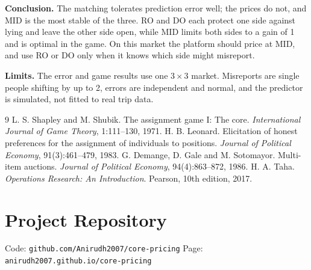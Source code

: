 \documentclass[11pt,a4paper]{article}
\begin{document}
\textbf{Conclusion.} The matching tolerates prediction error well; the prices do not, and MID is the most stable of the three. RO and DO each protect one side against lying and leave the other side open, while MID limits both sides to a gain of 1 and is optimal in the game. On this market the platform should price at MID, and use RO or DO only when it knows which side might misreport.

\textbf{Limits.} The error and game results use one $3\times3$ market. Misreports are single people shifting by up to 2, errors are independent and normal, and the predictor is simulated, not fitted to real trip data.

{\footnotesize
\begin{thebibliography}{9}
\setlength{\itemsep}{0pt}
 L. S. Shapley and M. Shubik. The assignment game I: The core. \emph{International Journal of Game Theory}, 1:111--130, 1971.
 H. B. Leonard. Elicitation of honest preferences for the assignment of individuals to positions. \emph{Journal of Political Economy}, 91(3):461--479, 1983.
 G. Demange, D. Gale and M. Sotomayor. Multi-item auctions. \emph{Journal of Political Economy}, 94(4):863--872, 1986.
 H. A. Taha. \emph{Operations Research: An Introduction}. Pearson, 10th edition, 2017.
\end{thebibliography}
}

\section*{Project Repository}
{\small Code: \texttt{github.com/Anirudh2007/core-pricing} \quad Page: \texttt{anirudh2007.github.io/core-pricing}}
\end{document}
